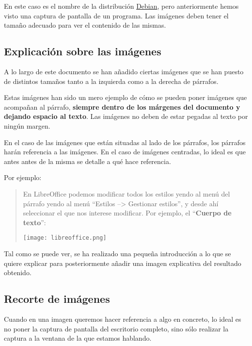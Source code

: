 \begin{center}
    
\end{center}

En este caso es el nombre de la distribución \href{https://www.debian.org/}{Debian}, pero anteriormente hemos visto una captura de pantalla de un programa. Las imágenes deben tener el tamaño adecuado para ver el contenido de las mismas.

\subsection{Explicación sobre las imágenes}
A lo largo de este documento se han añadido ciertas imágenes que se han puesto de distintos tamaños tanto a la izquierda como a la derecha de párrafos.

Estas imágenes han sido un mero ejemplo de cómo se pueden poner imágenes que acompañan al párrafo, \textbf{siempre dentro de los márgenes del documento y dejando espacio al texto}. Las imágenes no deben de estar pegadas al texto por ningún margen.


En el caso de las imágenes que están situadas al lado de los párrafos, los párrafos harán referencia a las imágenes. En el caso de imágenes centradas, lo ideal es que antes antes de la misma se detalle a qué hace referencia.


Por ejemplo:

\begin{quote}
En LibreOffice podemos modificar todos los estilos yendo al menú del párrafo yendo al menú “Estilos --> Gestionar estilos”, y desde ahí seleccionar el que nos interese modificar. Por ejemplo, el “\textbf{Cuerpo de texto}”:

\begin{center}
    \texttt{[image: libreoffice.png]}
\end{center}
\end{quote}

Tal como se puede ver, se ha realizado una pequeña introducción a lo que se quiere explicar para posteriormente añadir una imagen explicativa del resultado obtenido.

\subsection{Recorte de imágenes}
Cuando en una imagen queremos hacer referencia a algo en concreto, lo ideal es no poner la captura de pantalla del escritorio completo, sino sólo realizar la captura a la ventana de la que estamos hablando.


